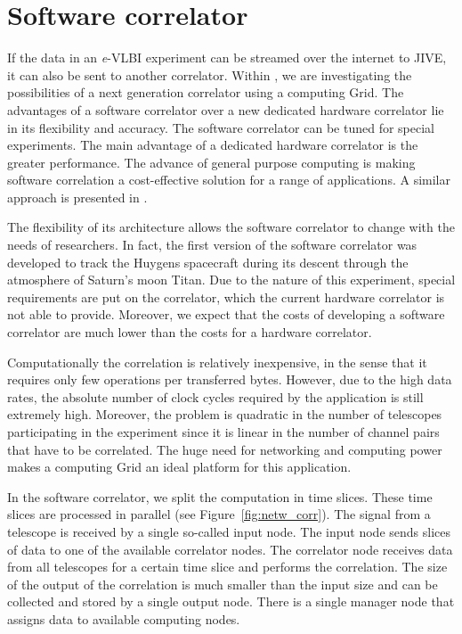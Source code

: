 \section{Software correlator}\label{sec:vlbi}
If the data in an {\it e}-VLBI experiment can be streamed over the
internet to JIVE, it can also be sent to another correlator. Within
\scarie, we are investigating the possibilities of a next generation
correlator using a computing Grid. The advantages of a software
correlator over a new dedicated hardware correlator lie in its
flexibility and accuracy. The software correlator can be tuned for
special experiments. The main advantage of a dedicated hardware
correlator is the greater performance. The advance of general purpose
computing is making software correlation a cost-effective solution for
a range of applications. A similar approach is presented in
\cite{deller-2007}.

The flexibility of its architecture allows the software correlator to
change with the needs of researchers. In fact, the first version of
the software correlator was developed to track the Huygens spacecraft
during its descent through the atmosphere of Saturn's moon Titan. Due
to the nature of this experiment, special requirements are put on the
correlator, which the current hardware correlator is not able to
provide.  Moreover, we expect that the costs of developing a software
correlator are much lower than the costs for a hardware correlator.

Computationally the correlation is relatively inexpensive, in the
sense that it requires only few operations per transferred bytes.
However, due to the high data rates, the absolute number of clock
cycles required by the application is still extremely high. Moreover,
the problem is quadratic in the number of telescopes participating in
the experiment since it is linear in the number of channel pairs that
have to be correlated. The huge need for networking and computing
power makes a computing Grid an ideal platform for this application.

In the software correlator, we split the computation in time slices.
These time slices are processed in parallel (see
Figure~\ref{fig:netw_corr}). The signal from a telescope is received
by a single so-called input node.  The input node sends slices of data
to one of the available correlator nodes. The correlator node receives
data from all telescopes for a certain time slice and performs the
correlation. The size of the output of the correlation is much smaller
than the input size and can be collected and stored by a single output
node.  There is a single manager node that assigns data to available
computing nodes.



